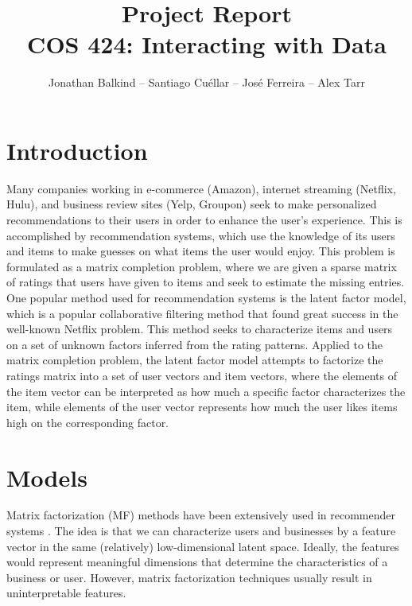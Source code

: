 \documentclass[12pt]{article}
\begin{document}
\title{Project Report \\ \vspace{5mm} \large{COS 424: Interacting with Data}}
\author{Jonathan Balkind -- Santiago Cu\'ellar -- Jos\'e Ferreira -- Alex Tarr} 
\maketitle


\section{Introduction} 
Many companies working in e-commerce (Amazon), internet streaming (Netflix, Hulu), and business review sites (Yelp, Groupon) seek 
to make personalized recommendations to their users in order to enhance the user's experience. This is accomplished by recommendation systems, 
which use the knowledge of its users and items to make guesses on what items the user would enjoy. This problem is formulated as a matrix completion 
problem, where we are given a sparse matrix of ratings that users have given to items and seek to estimate the missing entries.
	One popular method used for recommendation systems is the latent factor model, which is a popular collaborative filtering method that found great 
	success in the well-known Netflix problem. This method seeks to characterize items and users on a set of unknown factors inferred from the rating patterns. 
	Applied to the matrix completion problem, the latent factor model attempts to factorize the ratings matrix into a set 
	of user vectors and item vectors, where the elements of the item vector can be interpreted as how much a specific factor characterizes the item, while elements 
	of the user vector represents how much the user likes items high on the corresponding factor. 


\section{Models}

Matrix factorization (MF) methods have been extensively used in recommender systems \cite{koren09}. The idea is that we can characterize users and businesses by a feature vector in the same (relatively) low-dimensional latent space. Ideally, the features would represent meaningful dimensions that determine the characteristics of a business or user. However, matrix factorization techniques usually result in uninterpretable features. 
\end{document}
